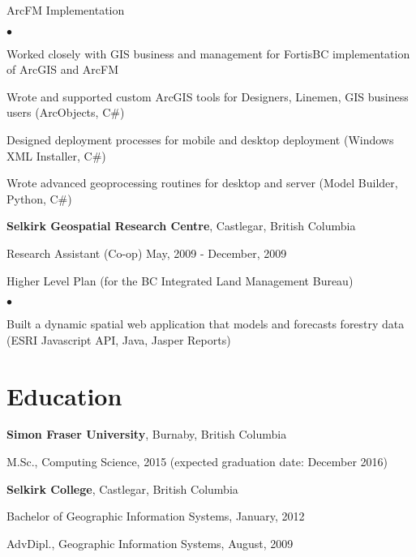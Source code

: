 \documentclass[11pt,margin,line]{res}
\newenvironment{list1}{
  \begin{list}{\ding{113}}{%
      \setlength{\itemsep}{0in}
      \setlength{\parsep}{0in} \setlength{\parskip}{0in}
      \setlength{\topsep}{0in} \setlength{\partopsep}{0in} 
      \setlength{\leftmargin}{0in}}}{\end{list}}
\newenvironment{list2}{
  \begin{list}{$\bullet$}{%
      \setlength{\itemsep}{0in}
      \setlength{\parsep}{0in} \setlength{\parskip}{0in}
      \setlength{\topsep}{0in} \setlength{\partopsep}{0in} 
      \setlength{\leftmargin}{0.25in}}}{\end{list}}
\begin{document}
\begin{resume}
{\prj ArcFM Implementation}
\vspace{.1cm}
\begin{list2}
\item Worked closely with GIS business and management for FortisBC implementation of ArcGIS and ArcFM
\item Wrote and supported custom ArcGIS tools for Designers, Linemen, GIS business users (ArcObjects, C\#)
\item Designed deployment processes for mobile and desktop deployment (Windows XML Installer, C\#)
\item Wrote advanced geoprocessing routines for desktop and server (Model Builder, Python, C\#)
\end{list2}

{\bf Selkirk Geospatial Research Centre}, Castlegar, British Columbia

\vspace{-.4cm}
Research Assistant (Co-op) \hfill {\wdates May, 2009 - December, 2009}

{\prj Higher Level Plan (for the BC Integrated Land Management Bureau)}
\vspace{.1cm}
\begin{list2}
\item Built a dynamic spatial web application that models and forecasts forestry data (ESRI Javascript API, Java, Jasper Reports)
\end{list2}

\section{\sc Education}
{\bf Simon Fraser University}, Burnaby, British Columbia\\
\vspace*{-.15in}
\begin{list1}
\item[] M.Sc., Computing Science, 2015 (expected graduation date: December 2016)
\end{list1}

{\bf Selkirk College}, Castlegar, British Columbia\\
\vspace*{-.15in}
\begin{list1}
\item[] Bachelor of Geographic Information Systems, January, 2012
\item[] AdvDipl., Geographic Information Systems, August, 2009
\end{list1}


\end{resume}
\end{document}
